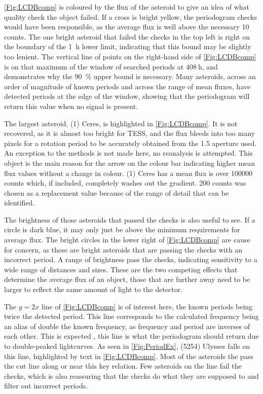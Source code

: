 \documentclass{UCreport}
\begin{document}
\autoref{Fig:LCDBcomp} is coloured by the flux of the asteroid to give an idea of what quality check the object failed.
If a cross is bright yellow, the periodogram checks would have been responsible, as the average flux is well above the necessary 10 counts.
The one bright asteroid that failed the checks in the top left is right on the boundary of the \qty{1}{\hour} lower limit, indicating that this bound may be slightly too lenient.
The vertical line of points on the right-hand side of \autoref{Fig:LCDBcomp} is on that maximum of the window of searched periods at $\qty{408}{\hour}$, and demonstrates why the \qty{90}{\percent} upper bound is necessary.
Many asteroids, across an order of magnitude of known periods and across the range of mean fluxes, have detected periods at the edge of the window, showing that the periodogram will return this value when no signal is present.

The largest asteroid, (1) Ceres, is highlighted in \autoref{Fig:LCDBcomp}.
It is not recovered, as it is almost too bright for TESS, and the flux bleeds into too many pixels for a rotation period to be accurately obtained from the \qty{1.5}{\px} aperture used.
An exception to the methods is not made here, no reanalysis is attempted.
This object is the main reason for the arrow on the colour bar indicating higher mean flux values without a change in colour.
(1) Ceres has a mean flux is over 100000 counts which, if included, completely washes out the gradient.
200 counts was chosen as a replacement value because of the range of detail that can be identified.


The brightness of those asteroids that passed the checks is also useful to see.
If a circle is dark blue, it may only just be above the minimum requirements for average flux.
The bright circles in the lower right of \autoref{Fig:LCDBcomp} are cause for concern, as these are bright asteroids that are passing the checks with an incorrect period.
A range of brightness pass the checks, indicating sensitivity to a wide range of distances and sizes.
These are the two competing effects that determine the average flux of an object, those that are further away need to be larger to reflect the same amount of light to the detector.

The $y=2x$ line of \autoref{Fig:LCDBcomp} is of interest here, the known periods being twice the detected period.
This line corresponds to the calculated frequency being an alias of double the known frequency, as frequency and period are inverses of each other.
This is expected \citep{McNeill2023}, this line is what the periodogram should return due to double-peaked lightcurves.
As seen in \autoref{Fig:PeriodEx}, (5254) Ulysses falls on this line, highlighted by text in \autoref{Fig:LCDBcomp}.
Most of the asteroids the pass the cut line along or near this key relation.
Few asteroids on the line fail the checks, which is also reassuring that the checks do what they are supposed to and filter out incorrect periods.
\end{document}
